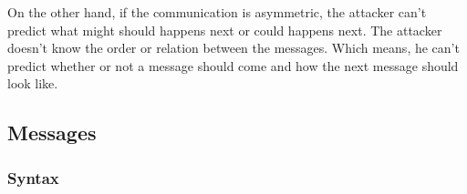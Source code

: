 \documentclass[12pt,journal,compsoc]{IEEEtran}
\newcommand{\Peers}[0]{Objects }
\begin{document}
On the other hand, if the communication is asymmetric, the attacker can't predict what might 
should happens next or could happens next. The attacker doesn't know the order or relation between the 
messages. Which means, he can't predict whether or not a message should come and how the next message 
should look like. 

\subsection{Messages}

%


\subsubsection{Syntax}
\end{document}
